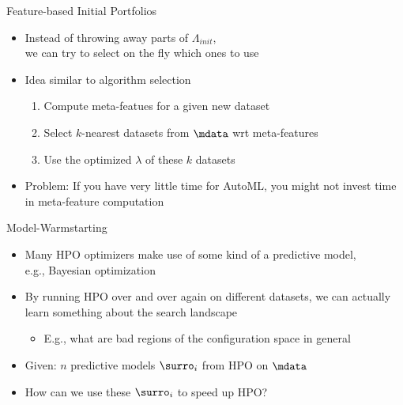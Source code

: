 \begin{frame}[c]{Feature-based Initial Portfolios}

\begin{itemize}
	\item Instead of throwing away parts of $\Lambda_{init}$, \\
	we can try to select on the fly which ones to use
	\pause
	\item Idea similar to algorithm selection
	\begin{enumerate}
		\item Compute meta-featues for a given new dataset
		\item Select $k$-nearest datasets from $\mdata$ wrt meta-features
		\item Use the optimized $\lambda$ of these $k$ datasets
	\end{enumerate}
	\pause
	\medskip
	\item Problem: If you have very little time for AutoML,
	you might not invest time in meta-feature computation
\end{itemize}


\end{frame}
\begin{frame}[c]{Model-Warmstarting}

\begin{itemize}
	\item Many HPO optimizers make use of some kind of a predictive model,\\
	e.g., Bayesian optimization
	\pause
	\item By running HPO over and over again on different datasets,
	we can actually learn something about the search landscape
	\begin{itemize}
		\item E.g., what are bad regions of the configuration space in general
	\end{itemize}
	\pause
	\smallskip
	\item Given: $n$ predictive models $\surro_i$ from HPO on $\mdata$
	\item \alert{How can we use these $\surro_i$ to speed up HPO?}
\end{itemize}


\end{frame}
